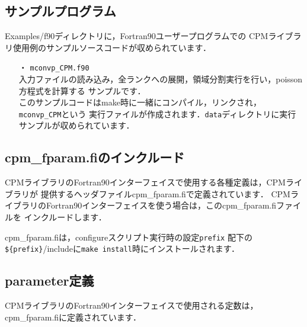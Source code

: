 \subsection{サンプルプログラム}

Examples/f90ディレクトリに，Fortran90ユーザープログラムでの
CPMライブラリ使用例のサンプルソースコードが収められています．

\begin{itemize}
\item[・] {\tt mconvp\_CPM.f90} \\
入力ファイルの読み込み，全ランクへの展開，領域分割実行を行い，poisson方程式を計算する
サンプルです．\\
このサンプルコードはmake時に一緒にコンパイル，リンクされ，{\tt mconvp\_CPM}という
実行ファイルが作成されます．{\tt data}ディレクトリに実行サンプルが収められています．
\end{itemize}


\subsection{cpm\_fparam.fiのインクルード}

CPMライブラリのFortran90インターフェイスで使用する各種定義は，CPMライブラリが
提供するヘッダファイルcpm\_fparam.fiで定義されています．
CPMライブラリのFortran90インターフェイスを使う場合は，このcpm\_fparam.fiファイルを
インクルードします．

cpm\_fparam.fiは，configureスクリプト実行時の設定{\tt prefix}
配下の{\tt \$\{prefix\}}/includeに{\tt make install}時にインストールされます．\\


\subsection{parameter定義}

CPMライブラリのFortran90インターフェイスで使用される定数は，
cpm\_fparam.fiに定義されています．

